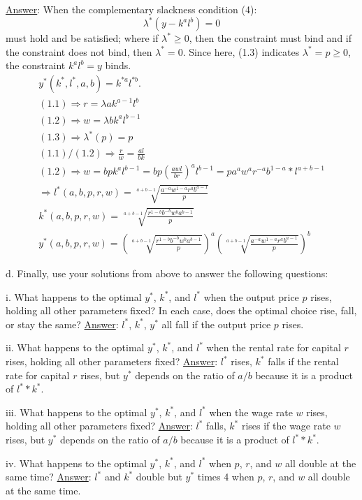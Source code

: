 \documentclass[12pt]{article}
\begin{document}
\begin{description}
\newline
\underline{Answer}: When the complementary slackness condition (4): 
\[\lambda^*(y - k^al^b) = 0 \] must hold and be satisfied; where if $\lambda^* \geq 0$, then the constraint must bind and if the constraint does not bind, then $\lambda^* = 0$. 
\newline Since here, (1.3) indicates $\lambda^* = p \geq 0$, the constraint $k^al^b = y$ binds. 
\begin{gather*}
    y^*(k^*, l^*, a, b) = k^{*a}l^{*b} .  \\ 
    (1.1) \Rightarrow r = \lambda ak^{a-1}l^b \\
    (1.2) \Rightarrow w = \lambda bk^al^{b-1} \\
    (1.3) \Rightarrow \lambda^*(p) = p  \\ 
    (1.1)/(1.2) \Rightarrow \frac{r}{w} = \frac{al}{bk} \\
    (1.2) \Rightarrow w = bpk^{a}l^{b-1} = bp(\frac{awl}{br})^al^{b-1} = pa^aw^ar^{-a}b^{1-a}*l^{a+b-1} \\
    \Rightarrow l^*(a,b,p,r,w) = \sqrt[a+b-1]{\frac{a^{-a}w^{1-a}r^ab^{a-1}}{p}}  \\
    k^*(a,b,p,r,w) = \sqrt[a+b-1]{\frac{r^{1-b}b^{-b}w^ba^{b-1}}{p}}  \\
    y^*(a,b,p,r,w) = (\sqrt[a+b-1]{\frac{r^{1-b}b^{-b}w^ba^{b-1}}{p}})^a(\sqrt[a+b-1]{\frac{a^{-a}w^{1-a}r^ab^{a-1}}{p}})^b
\end{gather*}
\item d. Finally, use your solutions from above to answer the following questions:
\begin{description}
\item i. What happens to the optimal $y^{*}$, $k^{*}$, and $l^{*}$ when the output price $p$ rises, holding all other parameters fixed? In each case, does the optimal choice rise, fall, or stay the same?
\newline
\underline{Answer}: $l^*$, $k^*$, $y^*$ all fall if the output price $p$ rises. 
\item ii. What happens to the optimal $y^{*}$, $k^{*}$, and $l^{*}$ when the rental rate for capital $r$ rises, holding all other parameters fixed?
\newline
\underline{Answer}: $l^*$ rises, $k^*$ falls if the rental rate for capital $r$ rises, but $y^*$ depends on the ratio of $a/b$ because it is a product of $l^* * k^*$. 
\item iii. What happens to the optimal $y^{*}$, $k^{*}$, and $l^{*}$ when the wage rate $w$ rises, holding all other parameters fixed?
\newline
\underline{Answer}: $l^*$ falls, $k^*$ rises if the wage rate $w$ rises, but $y^*$ depends on the ratio of $a/b$ because  it is a product of $l^* * k^*$. 
\item iv. What happens to the optimal $y^{*}$, $k^{*}$, and $l^{*}$ when $p$, $r$, and $w$ all double at the same time?
\newline
\underline{Answer}: $l^*$ and $k^*$ double but $y^*$ times 4 when $p$, $r$, and $w$ all double at the same time.
\end{description}
\end{description}
\end{document}
